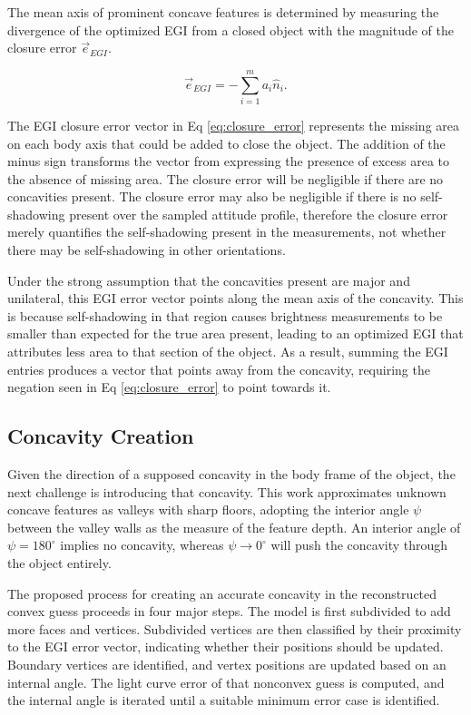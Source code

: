 The mean axis of prominent concave features is determined by measuring the divergence of the optimized EGI from a closed object with the magnitude of the closure error $\vec{e}_{EGI}$.

\begin{equation} \label{eq:closure_error}
  \vec{e}_{EGI} = -\sum_{i=1}^{m} a_i \hat{n}_i.
\end{equation}

The EGI closure error vector in Eq \ref{eq:closure_error} represents the missing area on each body axis that could be added to close the object. The addition of the minus sign transforms the vector from expressing the presence of excess area to the absence of missing area. The closure error will be negligible if there are no concavities present. The closure error may also be negligible if there is no self-shadowing present over the sampled attitude profile, therefore the closure error merely quantifies the self-shadowing present in the measurements, not whether there may be self-shadowing in other orientations.

Under the strong assumption that the concavities present are major and unilateral, this EGI error vector points along the mean axis of the concavity. This is because self-shadowing in that region causes brightness measurements to be smaller than expected for the true area present, leading to an optimized EGI that attributes less area to that section of the object. As a result, summing the EGI entries produces a vector that points away from the concavity, requiring the negation seen in Eq \ref{eq:closure_error} to point towards it.

\subsection{Concavity Creation}

Given the direction of a supposed concavity in the body frame of the object, the next challenge is introducing that concavity. This work approximates unknown concave features as valleys with sharp floors, adopting the interior angle $\psi$ between the valley walls as the measure of the feature depth. An interior angle of $\psi=180^\circ$ implies no concavity, whereas $\psi \rightarrow 0^\circ$ will push the concavity through the object entirely.

The proposed process for creating an accurate concavity in the reconstructed convex guess proceeds in four major steps. The model is first subdivided to add more faces and vertices. Subdivided vertices are then classified by their proximity to the EGI error vector, indicating whether their positions should be updated. Boundary vertices are identified, and vertex positions are updated based on an internal angle. The light curve error of that nonconvex guess is computed, and the internal angle is iterated until a suitable minimum error case is identified.

